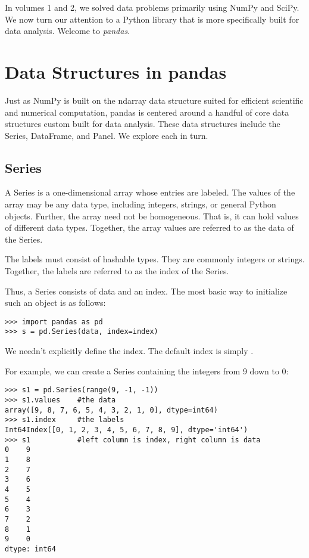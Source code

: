 
In volumes 1 and 2, we solved data problems primarily using NumPy and SciPy.
We now turn our attention to a Python library that is more specifically built for data
analysis. Welcome to \emph{pandas}.

\section*{Data Structures in pandas}
Just as NumPy is built on the ndarray data structure suited for efficient scientific and numerical
computation, pandas is centered around a handful of core data structures custom built for data
analysis. These data structures include the Series, DataFrame, and Panel. We explore each in turn.

\subsection*{Series}
A Series is a one-dimensional array whose entries are labeled. The values of the array may be 
any data type, including integers, strings, or general Python objects. Further, the array
need not be homogeneous. That is, it can hold values of different data types. Together, the
array values are referred to as the data of the Series.

The labels must consist of hashable types. They are commonly integers or strings. 
Together, the labels are referred to as the index of the Series.

Thus, a Series consists of data and an index. The most basic way to initialize such an object
is as follows:
\begin{lstlisting}
>>> import pandas as pd
>>> s = pd.Series(data, index=index)
\end{lstlisting}
We needn't explicitly define the index. The default index is simply .

For example, we can create a Series containing the integers from 9 down to 0:
\begin{lstlisting}
>>> s1 = pd.Series(range(9, -1, -1))
>>> s1.values    #the data
array([9, 8, 7, 6, 5, 4, 3, 2, 1, 0], dtype=int64)
>>> s1.index     #the labels
Int64Index([0, 1, 2, 3, 4, 5, 6, 7, 8, 9], dtype='int64')
>>> s1           #left column is index, right column is data
0    9
1    8
2    7
3    6
4    5
5    4
6    3
7    2
8    1
9    0
dtype: int64
\end{lstlisting}

